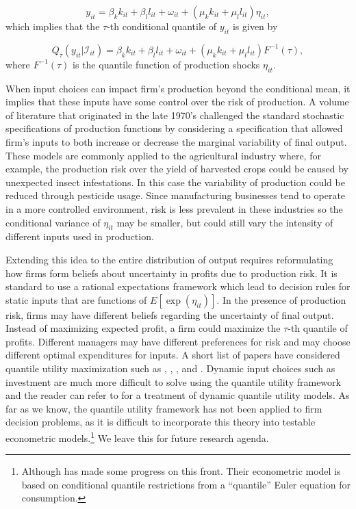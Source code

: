 \documentclass[12pt]{article}
\begin{document}
\begin{equation} \label{locationscale}
    y_{it}=\beta_{k}k_{it}+\beta_{l}l_{it}+\omega_{it}+(\mu_{k}k_{it}+\mu_{l}l_{it})\eta_{it},
\end{equation}
which implies that the $\tau$-th conditional quantile of $y_{it}$ is given by

\begin{equation}
Q_{\tau}(y_{it}|\mathcal{I}_{it})=\beta_{k}k_{it}+\beta_{l}l_{it}+\omega_{it}+(\mu_{k}k_{it}+\mu_{l}l_{it})F^{-1}(\tau),
\end{equation}
where $F^{-1}(\tau)$ is the quantile function of production shocks $\eta_{it}$.

When input choices can impact firm's production beyond the conditional mean, it implies that these inputs have some control over the risk of production. A volume of literature that originated in the late 1970's challenged the standard stochastic specifications of production functions \citep{Just1978,Just1979} by considering a specification that allowed firm's inputs to both increase or decrease the marginal variability of final output. These models are commonly applied to the agricultural industry where, for example, the production risk over the yield of harvested crops could be caused by unexpected insect infestations. In this case the variability of production could be reduced through pesticide usage. Since manufacturing businesses tend to operate in a more controlled environment, risk is less prevalent in these industries so the conditional variance of $\eta_{it}$ may be smaller, but could still vary the intensity of different inputs used in production.

Extending this idea to the entire distribution of output requires reformulating how firms form beliefs about uncertainty in profits due to production risk. It is standard to use a rational expectations framework which lead to decision rules for static inputs that are functions of $E[\exp(\eta_{it})]$. In the presence of production risk, firms may have different beliefs regarding the uncertainty of final output. Instead of maximizing expected profit, a firm could maximize the $\tau$-th quantile of profits. Different managers may have different preferences for risk and may choose different optimal expenditures for inputs. A short list of papers have considered quantile utility maximization such as \cite{Manski1988}, \cite{ROSTEK2009}, \cite{Chambers2007}, and \cite{Bhattacharya2009}. Dynamic input choices such as investment are much more difficult to solve using the quantile utility framework and the reader can refer to \cite{Castro2019} for a treatment of dynamic quantile utility models. As far as we know, the quantile utility framework has not been applied to firm decision problems, as it is difficult to incorporate this theory into testable econometric models.\footnote{Although \cite{qgmm} has made some progress on this front. Their econometric model is based on conditional quantile restrictions from a ``quantile'' Euler equation for consumption.} We leave this for future research agenda.
\end{document}
